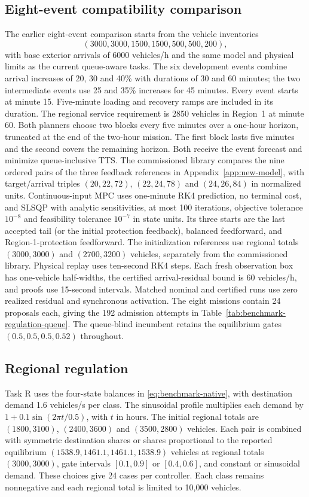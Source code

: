 \documentclass[journal,10pt]{IEEEtran}
\newcommand{\appref}[1]{Appendix~\ref{#1}}
\begin{document}
\subsection{Eight-event compatibility comparison}
\label{app:compatibility-protocol}
The earlier eight-event comparison starts from the vehicle inventories
\[
(3000,3000,1500,1500,500,500,200),
\]
with base exterior arrivals
of 6000 vehicles/h and the same model and physical limits as the current
queue-aware tasks. The six development events combine arrival increases
of 20, 30 and 40\% with durations of 30 and 60 minutes; the two
intermediate events use 25 and 35\% increases for 45 minutes. Every event
starts at minute 15. Five-minute loading and recovery ramps are included
in its duration. The regional service requirement is 2850 vehicles in
Region~1 at minute 60. Both planners choose two blocks every five minutes
over a one-hour horizon, truncated at the end of the two-hour mission.
The first block lasts five minutes and the second covers the remaining
horizon. Both receive the event forecast and minimize queue-inclusive TTS.
The commissioned library compares the nine ordered pairs of the three
feedback references in \appref{app:new-model}, with target/arrival triples
$(20,22,72)$, $(22,24,78)$ and $(24,26,84)$ in normalized units.
Continuous-input MPC uses one-minute RK4 prediction, no terminal cost,
and SLSQP with analytic sensitivities, at most 100 iterations, objective
tolerance $10^{-8}$ and feasibility tolerance $10^{-7}$ in state units.
Its three starts are the last accepted tail (or the initial protection
feedback), balanced feedforward, and Region-1-protection feedforward.
The initialization references use regional totals $(3000,3000)$ and
$(2700,3200)$ vehicles, separately from the commissioned library.
Physical replay uses ten-second RK4 steps. Each fresh observation box has
one-vehicle half-widths, the certified arrival-residual bound is
60 vehicles/h, and proofs use 15-second intervals. Matched nominal and
certified runs use zero realized residual and synchronous activation.
The eight missions contain 24 proposals each, giving the 192 admission
attempts in Table~\ref{tab:benchmark-regulation-queue}. The queue-blind
incumbent retains the equilibrium gates $(0.5,0.5,0.5,0.52)$ throughout.

\subsection{Regional regulation}
Task R uses the four-state balances in \eqref{eq:benchmark-native}, with
destination demand 1.6 vehicles/s per class. The sinusoidal profile
multiplies each demand by $1+0.1\sin(2\pi t/0.5)$, with $t$ in hours.
The initial regional totals are $(1800,3100)$, $(2400,3600)$ and
$(3500,2800)$ vehicles. Each pair is combined with symmetric destination
shares or shares proportional to the reported equilibrium
$(1538.9,1461.1,1461.1,1538.9)$ vehicles at regional totals $(3000,3000)$,
gate intervals $[0.1,0.9]$ or $[0.4,0.6]$, and constant or sinusoidal
demand. These choices give 24 cases per controller. Each class remains
nonnegative and each regional total is limited to 10,000 vehicles.
\end{document}
